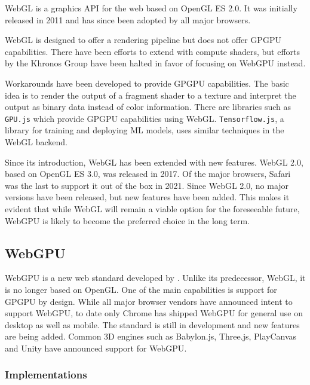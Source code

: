 \gls{WebGL} is a graphics \gls{API} for the web based on \gls{OpenGL ES} 2.0. It was initially released in 2011 and has since been adopted by all major browsers.

\gls{WebGL} is designed to offer a rendering pipeline but does not offer \gls{GPGPU} capabilities. There have been efforts to extend with compute shaders, but efforts by the \gls{Khronos Group} have been halted in favor of focusing on \gls{WebGPU} instead.

Workarounds have been developed to provide \gls{GPGPU} capabilities. The basic idea is to render the output of a fragment shader to a texture and interpret the output as binary data instead of color information. There are libraries such as \texttt{GPU.js} which provide \gls{GPGPU} capabilities using \gls{WebGL}. \texttt{Tensorflow.js}, a library for training and deploying \gls{ML} models, uses similar techniques in the \gls{WebGL} backend.

Since its introduction, \gls{WebGL} has been extended with new features. \gls{WebGL} 2.0, based on \gls{OpenGL ES} 3.0, was released in 2017. Of the major browsers, Safari was the last to support it out of the box in 2021. Since \gls{WebGL} 2.0, no major versions have been released, but new features have been added. This makes it evident that while \gls{WebGL} will remain a viable option for the foreseeable future, \gls{WebGPU} is likely to become the preferred choice in the long term.

\newpage
\subsection*{WebGPU}

\gls{WebGPU} is a new web standard developed by  \cite{webgpuSpecification}. Unlike its predecessor, \gls{WebGL}, it is no longer based on \gls{OpenGL}. One of the main capabilities is support for \gls{GPGPU} by design. While all major browser vendors have announced intent to support \gls{WebGPU}, to date only Chrome has shipped \gls{WebGPU} for general use on desktop as well as mobile.
The standard is still in development and new features are being added.
Common 3D engines such as \gls{Babylon.js}, \gls{Three.js}, \gls{PlayCanvas} and \gls{Unity} have announced support for \gls{WebGPU}.

\subsubsection{Implementations}

